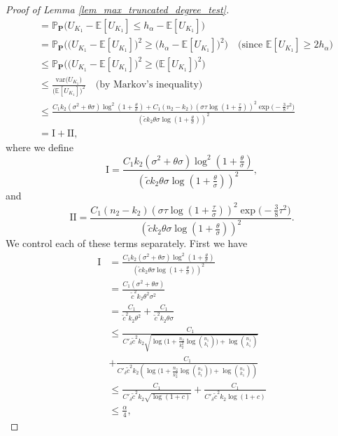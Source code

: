 \documentclass{article}
\newcommand{\bbP}{\mathbb{P}}
\newcommand{\bP}{\mathbf{P}}
\newcommand{\EE}{\mathbb{E}}
\newcommand{\var}{\textrm{var}}
\begin{document}
\begin{proof}[Proof of Lemma \ref{lem_max_truncated_degree_test}]
\begin{align*}
    &= \bbP_{\bP}\big(U_{K_1} - \EE[U_{K_1}]\leq h_\alpha - \EE[U_{K_1}]\big) \\
    &=\bbP_{\bP}\Big(\big(U_{K_1} - \EE[U_{K_1}]\big)^2\geq \big(h_\alpha - \EE[U_{K_1}]\big)^2\Big) \quad \text{(since $\EE[U_{K_1}] \geq 2h_\alpha$)} \\
    &\leq \bbP_{\bP}\Big(\big(U_{K_1} - \EE[U_{K_1}]\big)^2\geq \big(\EE[U_{K_1}]\big)^2\Big) \\
    &\leq \frac{\var\big(U_{K_1}\big)}{\big(\EE[U_{K_1}]\big)^2} \quad \text{(by Markov's inequality)} \\
    &\leq \frac{C_1 k_2 (\sigma^2 + \theta \sigma) \log^2\left(1 + \frac{\theta}{\sigma}\right) + C_1 (n_2 - k_2)\left(\sigma \tau \log(1 + \frac{\tau}{\sigma})\right)^2\exp\big(-\frac38 \tau^2\big)}{\left(\tilde{c}k_2\theta \sigma \log\left(1 + \frac{\theta}{\sigma}\right)\right)^2} \\
    &= \text{I} + \text{II},
\end{align*}
where we define
\[\text{I} = \frac{C_1 k_2 (\sigma^2 + \theta \sigma) \log^2\left(1 + \frac{\theta}{\sigma}\right)}{\left(\tilde{c}k_2\theta \sigma \log\left(1 + \frac{\theta}{\sigma}\right)\right)^2},\]
and 
\[\text{II} = \frac{C_1 (n_2 - k_2)\left(\sigma \tau \log(1 + \frac{\tau}{\sigma})\right)^2\exp\big(-\frac38 \tau^2\big)}{\left(\tilde{c}k_2\theta \sigma \log\left(1 + \frac{\theta}{\sigma}\right)\right)^2}.\]
We control each of these terms separately. First we have
\begin{align*}
    \text{I} &= \frac{C_1 k_2 (\sigma^2 + \theta \sigma) \log^2\left(1 + \frac{\theta}{\sigma}\right)}{\left(\tilde{c}k_2\theta \sigma \log\left(1 + \frac{\theta}{\sigma}\right)\right)^2} \\
    &= \frac{C_1(\sigma^2 + \theta \sigma)}{\tilde{c}^2k_2\theta^2 \sigma^2 } \\
    &= \frac{C_1}{\tilde{c}^2k_2\theta^2 }  + \frac{C_1}{\tilde{c}^2k_2\theta \sigma }\\
    &\leq \frac{C_1}{C'_\delta \tilde{c}^2 k_2\sqrt{\log\Big(1 + \frac{n_2}{k_2^2}\log {n_1 \choose k_1}\Big) + \log {n_1 \choose k_1}}} \\
    &+ \frac{C_1}{C'_\delta \tilde{c}^2 k_2 \left(\log\Big(1 + \frac{n_2}{k_2^2}\log {n_1 \choose k_1}\Big) + \log {n_1 \choose k_1}\right)}\\
    &\leq \frac{C_1}{C'_\delta \tilde{c}^2 k_2 \sqrt{\log(1 + c)}} + \frac{C_1}{C'_\delta \tilde{c}^2 k_2 \log(1 + c)} \\
    &\leq \frac{\alpha}{4},
\end{align*}

\end{proof}
\end{document}
